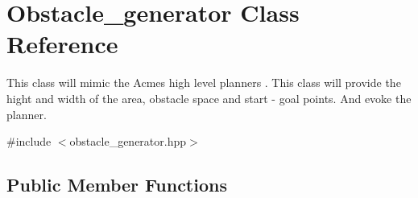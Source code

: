 \hypertarget{class_obstacle__generator}{}\section{Obstacle\+\_\+generator Class Reference}
\label{class_obstacle__generator}


This class will mimic the Acme\textquotesingle{}s high level planner\textquotesingle{}s . This class will provide the hight and width of the area, obstacle space and start -\/ goal points. And evoke the planner.  




{\ttfamily \#include $<$obstacle\+\_\+generator.\+hpp$>$}

\subsection*{Public Member Functions}
